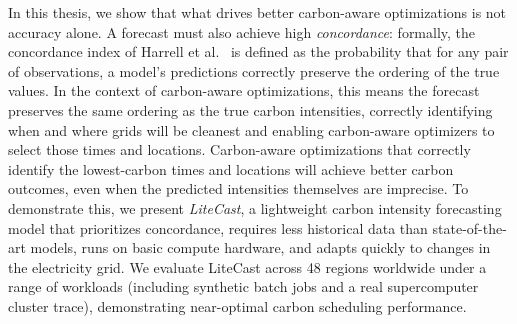In this thesis, we show that what drives better carbon-aware optimizations is not accuracy alone. 
A forecast must also achieve high \textit{concordance}: formally, the concordance index of Harrell et al.~\cite{harrell_concordance_1996} is defined as the probability that for any pair of observations, a model's predictions correctly preserve the ordering of the true values. 
In the context of carbon-aware optimizations, this means the forecast preserves the same ordering as the true carbon intensities, correctly identifying when and where grids will be cleanest and enabling carbon-aware optimizers to select those times and locations.
Carbon-aware optimizations that correctly identify the lowest-carbon times and locations will achieve better carbon outcomes, even when the predicted intensities themselves are imprecise.
To demonstrate this, we present \textit{LiteCast}, a lightweight carbon intensity forecasting model that prioritizes concordance, requires less historical data than state-of-the-art models, runs on basic compute hardware, and adapts quickly to changes in the electricity grid.
We evaluate LiteCast across 48 regions worldwide under a range of workloads (including synthetic batch jobs and a real supercomputer cluster trace), demonstrating near-optimal carbon scheduling performance.
